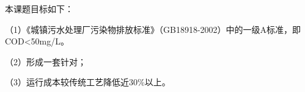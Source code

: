 本课题目标如下：\par
（1）《城镇污水处理厂污染物排放标准》\linebreak（GB18918-2002）中的一级A标准，即COD<50mg/L。\par
（2）形成一套针对；\par
（3）运行成本较传统工艺降低近30\%以上。\par
